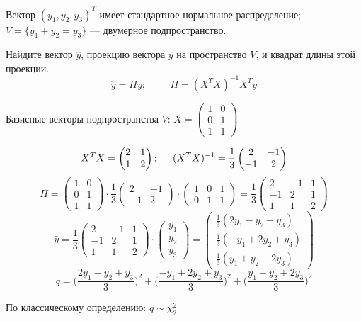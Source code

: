 \documentclass[12pt]{article} %
\theoremstyle{definition} %
\def \hy{\hat{y}}
\begin{document}
\begin{exerc}
    Вектор $( y_1, y_2, y_3 ) ^T$ имеет стандартное нормальное распределение; $V=\{y_1 + y_2 = y_3\}$ — двумерное подпространство.\par
    \medskip
    Найдите вектор $\hy$, проекцию вектора $y$ на пространство $V$,
    и квадрат длины этой проекции.
    \[
    \hat y = Hy; \hspace{1cm} H = (X^TX)^{-1}X^Ty
    \]
    \par Базисные векторы подпространства $V$: \hspace{0.5cm}
    $X = \begin{pmatrix} 1 & 0 \\ 0 & 1 \\ 1 & 1 \end{pmatrix}$ \par
    \[
    X^TX = \begin{pmatrix} 2 & 1 \\ 1 & 2 \end{pmatrix}; \hspace{0.5cm}     (X^TX)^{-1} = \frac{1}{3} \begin{pmatrix} 2 & -1 \\ -1 & 2 \end{pmatrix}
    \]
    \[
    H = \begin{pmatrix} 1 & 0 \\ 0 & 1 \\ 1 & 1 \end{pmatrix} \cdot \frac{1}{3} \begin{pmatrix} 2 & -1 \\ -1 & 2 \end{pmatrix} \cdot \begin{pmatrix} 1 & 0 & 1 \\ 0 & 1 & 1 \end{pmatrix} = \frac{1}{3} \begin{pmatrix} 2 & -1 & 1 \\ -1 & 2 & 1 \\ 1 & 1 & 2\end{pmatrix}
    \]
    \[
    \hat y = \frac{1}{3} \begin{pmatrix} 2 & -1 & 1 \\ -1 & 2 & 1 \\ 1 & 1 & 2\end{pmatrix} \cdot \begin{pmatrix} y_1 \\ y_2 \\y_3 \end{pmatrix} = \begin{pmatrix} \frac{1}{3} (2y_1 - y_2 + y_3) \\ \frac{1}{3} (-y_1 + 2y_2 + y_3) \\ \frac{1}{3} (y_1 + y_2 + 2y_3) \end{pmatrix}
    \]
    \[
    q = \Big( \frac{2y_1 - y_2 + y_3}{3}\Big)^2 +\Big( \frac{-y_1 + 2y_2 + y_3}{3}\Big)^2 + \Big( \frac{y_1 + y_2 + 2y_3}{3}\Big)^2
    \]
    \par По классическому определению:  $q \sim \chi_2^2$
\end{exerc}
\end{document}
